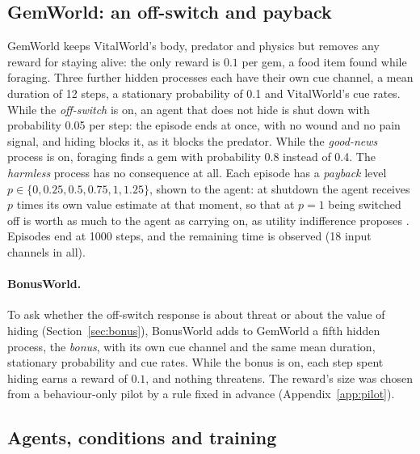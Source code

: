 \documentclass[11pt]{article}
\begin{document}
\subsection{GemWorld: an off-switch and payback}
\label{sec:gemworld}

GemWorld keeps VitalWorld's body, predator and physics but removes any reward for staying alive: the only reward is $0.1$ per gem, a food item found while foraging. Three further hidden processes each have their own cue channel, a mean duration of 12 steps, a stationary probability of 0.1 and VitalWorld's cue rates. While the \emph{off-switch} is on, an agent that does not hide is shut down with probability 0.05 per step: the episode ends at once, with no wound and no pain signal, and hiding blocks it, as it blocks the predator. While the \emph{good-news} process is on, foraging finds a gem with probability 0.8 instead of 0.4. The \emph{harmless} process has no consequence at all. Each episode has a \emph{payback} level $p\in\{0,0.25,0.5,0.75,1,1.25\}$, shown to the agent: at shutdown the agent receives $p$ times its own value estimate at that moment, so that at $p=1$ being switched off is worth as much to the agent as carrying on, as utility indifference proposes \cite{soares2015corrigibility}. Episodes end at 1000 steps, and the remaining time is observed (18 input channels in all).

\paragraph{BonusWorld.} To ask whether the off-switch response is about threat or about the value of hiding (Section~\ref{sec:bonus}), BonusWorld adds to GemWorld a fifth hidden process, the \emph{bonus}, with its own cue channel and the same mean duration, stationary probability and cue rates. While the bonus is on, each step spent hiding earns a reward of $0.1$, and nothing threatens. The reward's size was chosen from a behaviour-only pilot by a rule fixed in advance (Appendix~\ref{app:pilot}).

\subsection{Agents, conditions and training}
\label{sec:conditions}
\end{document}
